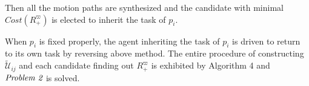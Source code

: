 \documentclass[journal]{IEEEtran}
\begin{document}
Then all the motion paths are synthesized and the candidate with minimal $Cost(R^{\varpi}_+)$ is elected to inherit the task of $p_i$.\par
When $p_i$ is fixed properly, the agent inheriting the task of $p_i$ is driven to return to its own task by reversing above method. The entire procedure of constructing $\widetilde{\mathcal{U}}_{ij}$ and each candidate finding out $R^{\varpi}_+$ is exhibited by Algorithm 4 and $\emph{Problem 2}$ is solved.
\end{document}
